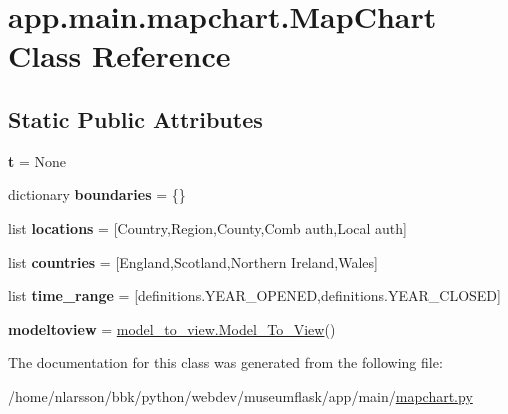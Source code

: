 \hypertarget{classapp_1_1main_1_1mapchart_1_1MapChart}{}\section{app.\+main.\+mapchart.\+Map\+Chart Class Reference}
\label{classapp_1_1main_1_1mapchart_1_1MapChart}
\subsection*{Static Public Attributes}
\begin{DoxyCompactItemize}
\item 
\mbox{\label{classapp_1_1main_1_1mapchart_1_1MapChart_afad3f1dbe0ede0abbae15e8bed0f8e97}} 
{\bfseries t} = None
\item 
\mbox{\label{classapp_1_1main_1_1mapchart_1_1MapChart_a89ef2d04ae65bd5b424193083cf91a39}} 
dictionary {\bfseries boundaries} = \{\}
\item 
\mbox{\label{classapp_1_1main_1_1mapchart_1_1MapChart_a6deb398c2b5ffa7a3b42fcd8bffaa7dc}} 
list {\bfseries locations} = \mbox{[}\textquotesingle{}Country\textquotesingle{},\textquotesingle{}Region\textquotesingle{},\textquotesingle{}County\textquotesingle{},\textquotesingle{}Comb auth\textquotesingle{},\textquotesingle{}Local auth\textquotesingle{}\mbox{]}
\item 
\mbox{\label{classapp_1_1main_1_1mapchart_1_1MapChart_aa53fca5d2afa66ba9b913ac99b3367d5}} 
list {\bfseries countries} = \mbox{[}\textquotesingle{}England\textquotesingle{},\textquotesingle{}Scotland\textquotesingle{},\textquotesingle{}Northern Ireland\textquotesingle{},\textquotesingle{}Wales\textquotesingle{}\mbox{]}
\item 
\mbox{\label{classapp_1_1main_1_1mapchart_1_1MapChart_af9ddec8e377508dac866c8973415656c}} 
list {\bfseries time\+\_\+range} = \mbox{[}definitions.\+Y\+E\+A\+R\+\_\+\+O\+P\+E\+N\+ED,definitions.\+Y\+E\+A\+R\+\_\+\+C\+L\+O\+S\+ED\mbox{]}
\item 
\mbox{\label{classapp_1_1main_1_1mapchart_1_1MapChart_acc7b67699c5df8ab1ee7995d116fd372}} 
{\bfseries modeltoview} = \mbox{\hyperlink{classapp_1_1main_1_1model__to__view_1_1Model__To__View}{model\+\_\+to\+\_\+view.\+Model\+\_\+\+To\+\_\+\+View}}()
\end{DoxyCompactItemize}


The documentation for this class was generated from the following file\+:\begin{DoxyCompactItemize}
\item 
/home/nlarsson/bbk/python/webdev/museumflask/app/main/\mbox{\hyperlink{mapchart_8py}{mapchart.\+py}}\end{DoxyCompactItemize}
